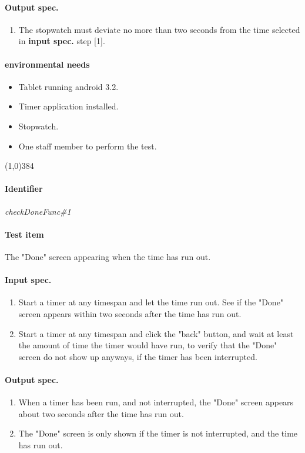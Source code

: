 \paragraph{Output spec.}
	\begin{enumerate}
		\item The stopwatch must deviate no more than two seconds from the time selected in \textbf{input spec.} step [1].
	\end{enumerate}
\paragraph{environmental needs}
	\begin{itemize}
		\item Tablet running android 3.2.
		\item Timer application installed.
		\item Stopwatch.
		\item One staff member to perform the test.
	\end{itemize}
\begin{center}
	\line(1,0){384}
\end{center}

\pagebreak
\paragraph{Identifier}
	\textit{checkDoneFunc\#1}
\paragraph{Test item}
	The "Done" screen appearing when the time has run out.
\paragraph{Input spec.}
	\begin{enumerate}
		\item Start a timer at any timespan and let the time run out. See if the "Done" screen appears within two seconds after the time has run out.
		\item Start a timer at any timespan and click the "back" button, and wait at least the amount of time the timer would have run, to verify that the "Done" screen do not show up anyways, if the timer has been interrupted.
	\end{enumerate}
\paragraph{Output spec.}
	\begin{enumerate}
		\item When a timer has been run, and not interrupted, the "Done" screen appears about two seconds after the time has run out.
		\item The "Done" screen is only shown if the timer is not interrupted, and the time has run out.
	\end{enumerate}
